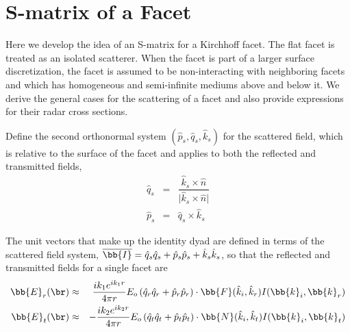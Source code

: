 
\clearpage
\section{S-matrix of a Facet}

Here we develop the idea of an S-matrix for a Kirchhoff facet. The flat facet is treated as an isolated scatterer. When the facet is part of a larger surface discretization, the facet is assumed to be non-interacting with neighboring facets and which has homogeneous and semi-infinite mediums above and below it. We derive the general cases for the scattering of a facet and also provide expressions for their radar cross sections.




Define the second orthonormal system $(\hat{p}_s,\hat{q}_s,\hat{k}_s)$ for the scattered field, which is relative to the surface of the facet and applies to both the reflected and transmitted fields, 
\begin{eqnarray}
\hat{q}_s &=& \dfrac{\hat{k}_s \times \hat{n} }{ \vert \hat{k}_s \times \hat{n} \vert } \\
\hat{p}_s &=& \hat{q}_s \times \hat{k}_s 
\end{eqnarray}

The unit vectors that make up the identity dyad are defined in terms of the scattered field system, $\overline{\bb{I}} = \hat{q}_s \hat{q}_s+ \hat{p}_s \hat{p}_s +\hat{k}_s \hat{k}_s$, so that the reflected and transmitted fields for a single facet are 
\begin{eqnarray}
\bb{E}_r(\br) & \approx & \dfrac{ik_1e^{ik_1r}}{4\pi r} E_o \left( \hat{q}_r \hat{q}_r+ \hat{p}_r \hat{p}_r \right)  \cdot  \bb{F}(\hat{k}_i,\hat{k}_r)  I(\bb{k}_i,\bb{k}_r) \\
\bb{E}_t(\br) & \approx & -\dfrac{ik_2e^{ik_2r}}{4\pi r} E_o \left( \hat{q}_t \hat{q}_t+ \hat{p}_t \hat{p}_t \right)  \cdot  \bb{N}(\hat{k}_i,\hat{k}_t)  I(\bb{k}_i,\bb{k}_t) 
\end{eqnarray}


